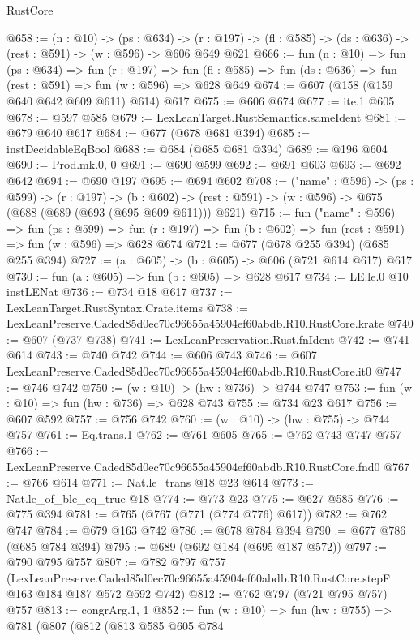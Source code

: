 \begin{lexlean}{RustCore}
\begin{coremodule}
@658 := (n : @10) ->
  (ps : @634) ->
  (r : @197) -> (fl : @585) -> (ds : @636) -> (rest : @591) -> (w : @596) -> @606 @649 @621
@666 := fun (n : @10) =>
  fun (ps : @634) =>
  fun (r : @197) =>
  fun (fl : @585) => fun (ds : @636) => fun (rest : @591) => fun (w : @596) => @628 @649
@674 := @607 (@158 (@159 @640 @642 @609 @611) @614) @617
@675 := @606 @674
@677 := ite.{1} @605
@678 := @597 @585
@679 := LexLeanTarget.RustSemantics.sameIdent
@681 := @679 @640 @617
@684 := @677 (@678 @681 @394)
@685 := instDecidableEqBool
@688 := @684 (@685 @681 @394)
@689 := @196 @604
@690 := Prod.mk.{0, 0}
@691 := @690 @599
@692 := @691 @603
@693 := @692 @642
@694 := @690 @197
@695 := @694 @602
@708 := ("name" : @596) ->
  (ps : @599) ->
  (r : @197) ->
  (b : @602) -> (rest : @591) -> (w : @596) -> @675 (@688 (@689 (@693 (@695 @609 @611))) @621)
@715 := fun ("name" : @596) =>
  fun (ps : @599) =>
  fun (r : @197) => fun (b : @602) => fun (rest : @591) => fun (w : @596) => @628 @674
@721 := @677 (@678 @255 @394) (@685 @255 @394)
@727 := (a : @605) -> (b : @605) -> @606 (@721 @614 @617) @617
@730 := fun (a : @605) => fun (b : @605) => @628 @617
@734 := LE.le.{0} @10 instLENat
@736 := @734 @18 @617
@737 := LexLeanTarget.RustSyntax.Crate.items
@738 := LexLeanPreserve.Caded85d0ec70c96655a45904ef60abdb.R10.RustCore.krate
@740 := @607 (@737 @738)
@741 := LexLeanPreservation.Rust.fnIdent
@742 := @741 @614
@743 := @740 @742
@744 := @606 @743
@746 := @607 LexLeanPreserve.Caded85d0ec70c96655a45904ef60abdb.R10.RustCore.it0
@747 := @746 @742
@750 := (w : @10) -> (hw : @736) -> @744 @747
@753 := fun (w : @10) => fun (hw : @736) => @628 @743
@755 := @734 @23 @617
@756 := @607 @592
@757 := @756 @742
@760 := (w : @10) -> (hw : @755) -> @744 @757
@761 := Eq.trans.{1}
@762 := @761 @605
@765 := @762 @743 @747 @757
@766 := LexLeanPreserve.Caded85d0ec70c96655a45904ef60abdb.R10.RustCore.fnd0
@767 := @766 @614
@771 := Nat.le_trans @18 @23 @614
@773 := Nat.le_of_ble_eq_true @18
@774 := @773 @23
@775 := @627 @585
@776 := @775 @394
@781 := @765 (@767 (@771 (@774 @776) @617))
@782 := @762 @747
@784 := @679 @163 @742
@786 := @678 @784 @394
@790 := @677 @786 (@685 @784 @394)
@795 := @689 (@692 @184 (@695 @187 @572))
@797 := @790 @795 @757
@807 := @782
    @797
    @757
    (LexLeanPreserve.Caded85d0ec70c96655a45904ef60abdb.R10.RustCore.stepF
      @163
      @184
      @187
      @572
      @592
      @742)
@812 := @762 @797 (@721 @795 @757) @757
@813 := congrArg.{1, 1}
@852 := fun (w : @10) =>
  fun (hw : @755) =>
  @781
    (@807
      (@812
        (@813
          @585
          @605
          @784

\end{coremodule}
\end{lexlean}

